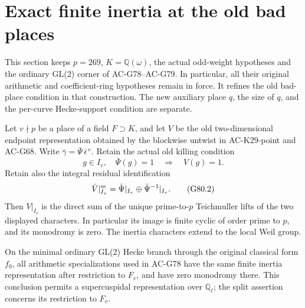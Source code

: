 \section{Exact finite inertia at the old bad places}
\label{sec:cubic-away-types}
This section keeps \(p=269\), \(K=\mathbb Q(\omega)\), the actual odd-weight
hypotheses and the ordinary GL(2) corner of AC-G78--AC-G79.  In particular,
all their original arithmetic and coefficient-ring hypotheses remain in
force.  It refines the old bad-place condition in that construction.
The new auxiliary place \(q\), the size of \(q\), and the per-curve
Hecke-support condition are separate.

\begin{proposition}
\label{prop:G80-inertia}
Let \(v\nmid p\) be a place of a field \(F\supset K\), and let \(V\) be the
old two-dimensional endpoint representation obtained by the blockwise
untwist in AC-K29-point and AC-G68.  Write
\(\bar\gamma=\bar\Psi\,\bar\epsilon^{\,e}\).
Retain the actual old killing condition
\[
 g\in I_v,\quad \bar\Psi(g)=1
 \quad\Longrightarrow\quad V(g)=1.                 \tag{G80.1}
\]
Retain also the integral residual identification
\[
 \bar V|_{I_v}^{\rm ss}
       =\bar\Psi|_{I_v}\oplus\bar\Psi^{-1}|_{I_v}.  \tag{G80.2}
\]
Then \(V|_{I_v}\) is the direct sum of the unique prime-to-\(p\)
Teichmuller lifts of the two displayed characters.  In particular its
image is finite cyclic of order prime to \(p\), and its monodromy is zero.
The inertia characters extend to the local Weil group.

On the minimal ordinary GL(2) Hecke branch through the original classical
form \(f_0\), all arithmetic specializations used in AC-G78 have the same
finite inertia representation after restriction to \(F_v\), and have
zero monodromy there.  This conclusion permits a supercuspidal
representation over \(\mathbb Q_\ell\); the split assertion concerns its
restriction to \(F_v\).
\end{proposition}


